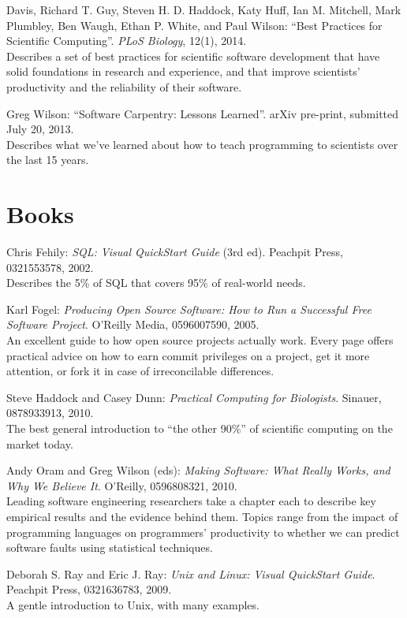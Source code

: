 \documentclass{book}
\begin{document}
\begin{swcitemize}
  Davis, Richard T. Guy, Steven H. D. Haddock, Katy Huff, Ian M.
  Mitchell, Mark Plumbley, Ben Waugh, Ethan P. White, and Paul Wilson:
  ``Best Practices for Scientific Computing''. \emph{PLoS Biology},
  12(1), 2014. \\ Describes a set of best practices for scientific
  software development that have solid foundations in research and
  experience, and that improve scientists' productivity and the
  reliability of their software.
\item
  Greg Wilson: ``Software Carpentry: Lessons Learned''. arXiv pre-print,
  submitted July 20, 2013. \\ Describes what we've learned about how to
  teach programming to scientists over the last 15 years.
\end{swcitemize}

\section{Books}

\begin{swcitemize}
\item
  Chris Fehily: \emph{SQL: Visual QuickStart Guide} (3rd ed). Peachpit
  Press, 0321553578, 2002. \\ Describes the 5\% of SQL that covers 95\%
  of real-world needs.
\item
  Karl Fogel: \emph{Producing Open Source Software: How to Run a
  Successful Free Software Project}. O'Reilly Media, 0596007590, 2005.
  \\ An excellent guide to how open source projects actually work. Every
  page offers practical advice on how to earn commit privileges on a
  project, get it more attention, or fork it in case of irreconcilable
  differences.
\item
  Steve Haddock and Casey Dunn: \emph{Practical Computing for
  Biologists}. Sinauer, 0878933913, 2010. \\ The best general
  introduction to ``the other 90\%'' of scientific computing on the
  market today.
\item
  Andy Oram and Greg Wilson (eds): \emph{Making Software: What Really
  Works, and Why We Believe It}. O'Reilly, 0596808321, 2010. \\ Leading
  software engineering researchers take a chapter each to describe key
  empirical results and the evidence behind them. Topics range from the
  impact of programming languages on programmers' productivity to
  whether we can predict software faults using statistical techniques.
\item
  Deborah S. Ray and Eric J. Ray: \emph{Unix and Linux: Visual
  QuickStart Guide}. Peachpit Press, 0321636783, 2009. \\ A gentle
  introduction to Unix, with many examples.
\end{swcitemize}
\end{document}
